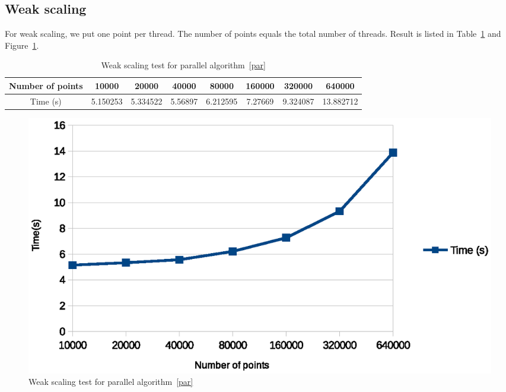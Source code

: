 \subsection{Weak scaling}
For weak scaling, we put one point per thread. The number of points equals the total number of threads.
Result is listed in Table~\ref{tab:weak-scaling} and Figure~\ref{fig:weak_scaling}.
\begin{table}[ht]
  \centering
  \begin{tabular}{|c|c|c|c|c|c|c|c|}
    \hline
    Number of points	& 10000	& 20000	& 40000	& 80000	& 160000	& 320000	& 640000 \\
    \hline
    Time (s)	& 5.150253	& 5.334522	& 5.56897	& 6.212595	& 7.27669	& 9.324087	& 13.882712 \\
    \hline
  \end{tabular}
  \label{tab:weak-scaling}
  \caption{Weak scaling test for parallel algorithm~\ref{par}}
\end{table}
\begin{figure}[!h]
  \centering
  \includegraphics[width=\linewidth]{fig/weak_scaling}
  \caption{Weak scaling test for parallel algorithm~\ref{par}}
  \label{fig:weak_scaling}
\end{figure}

